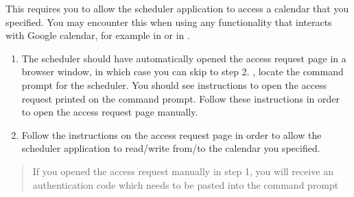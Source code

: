 \documentclass[letterpaper,10pt,english]{sphinxmanual}
\begin{document}
This requires you to allow the scheduler application to access a calendar
that you specified. You may encounter this when using any functionality that
interacts with Google calendar, for example in {\hyperref[\detokenize{index:generating-a-schedule}]{}}
or in {\hyperref[\detokenize{index:publishing-a-schedule-to-google-calendar}]{}}.
\begin{enumerate}
\item {} 
The scheduler should have automatically opened the access request page
in a browser window, in which case you can skip to step 2. ,
locate the command prompt for the scheduler. You should see instructions
to open the access request printed on the command prompt. Follow these instructions
in order to open the access request page manually.

\end{enumerate}

\begin{figure}[h!]
\centering
{}\end{figure}

\begin{DUlineblock}{0em}
\item[] 
\end{DUlineblock}
\begin{enumerate}
\setcounter{enumi}{1}
\item {} 
Follow the instructions on the access request page in order to allow
the scheduler application to read/write from/to the calendar you specified.

\end{enumerate}

\begin{figure}[h!]
\centering
{}\end{figure}

\begin{DUlineblock}{0em}
\item[] 
\end{DUlineblock}
\begin{quote}

 If you opened the access request manually in step 1, you will
receive an authentication code which needs to be pasted into the command prompt
\end{quote}
\end{document}
